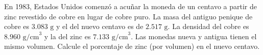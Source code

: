 \item En 1983, Estados Unidos comenzó a acuñar la moneda de un centavo a partir de zinc revestido de cobre en lugar de cobre puro. La masa del antiguo penique de cobre es $3.083 \text{ g}$ y el del nuevo centavo es de $2.517 \text{ g}$. La densidad del cobre es $8.960 \text{ g/cm}^3$ y la del zinc es $7.133 \text{ g/cm}^3$. Las monedas nueva y antigua tienen el mismo volumen. Calcule el porcentaje de zinc (por volumen) en el nuevo centavo.

